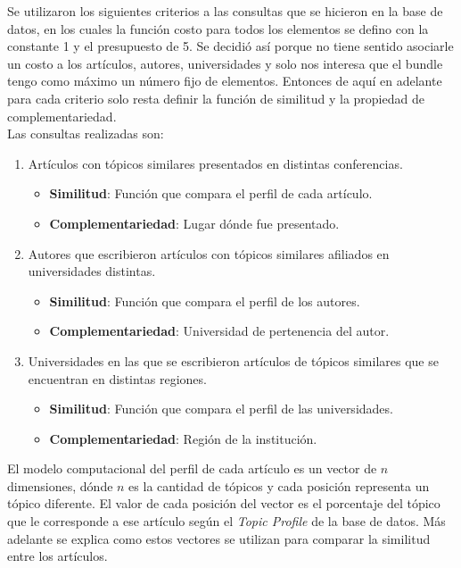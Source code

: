 Se utilizaron los siguientes criterios a las consultas que se hicieron en la base de datos, en los cuales la función costo para todos los elementos se defino con la constante 1 y el presupuesto de 5. Se decidió así porque no tiene sentido asociarle un costo a los artículos, autores, universidades y solo nos interesa que el bundle tengo como máximo un número fijo de elementos. Entonces de aquí en adelante para cada criterio solo resta definir la función de similitud y la propiedad de complementariedad.\\

Las consultas realizadas son:
\begin{enumerate}
	\item
		Artículos con tópicos similares presentados en distintas conferencias.
		\begin{itemize}
			\item \textbf{Similitud}: Función que compara el perfil de cada artículo.
			\item \textbf{Complementariedad}: Lugar dónde fue presentado.
		\end{itemize}

	\item
	Autores que escribieron artículos con tópicos similares afiliados en universidades distintas.
	\begin{itemize}
		\item \textbf{Similitud}: Función que compara el perfil de los autores.
		\item \textbf{Complementariedad}: Universidad de pertenencia del autor.
	\end{itemize}

	\item 
	Universidades en las que se escribieron artículos de tópicos similares que se encuentran en distintas regiones. 
	\begin{itemize}
		\item \textbf{Similitud}: Función que compara el perfil de las universidades.
		\item \textbf{Complementariedad}: Región de la institución.
	\end{itemize}
\end {enumerate}
El modelo computacional del perfil de cada artículo es un vector de $n$ dimensiones, dónde $n$ es la cantidad de tópicos y cada posición representa un tópico diferente. El valor de cada posición del vector es el porcentaje del tópico que le corresponde a ese artículo según el \textit{Topic Profile} de la base de datos. Más adelante se explica como estos vectores se utilizan para comparar la similitud entre los artículos.\\
